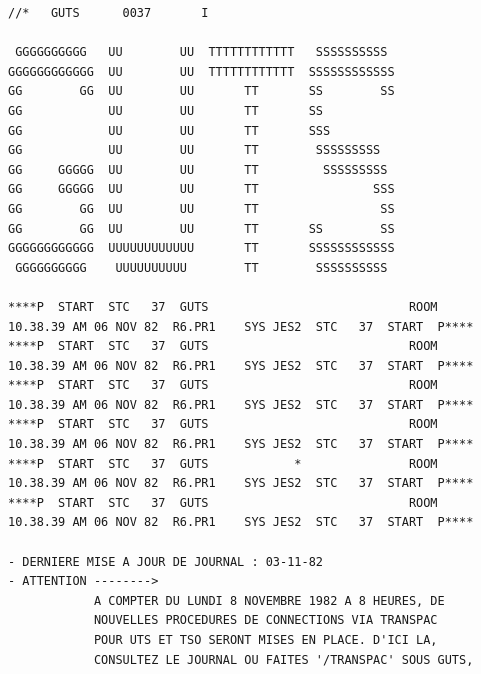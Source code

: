 {\tiny
\begin{verbatim}
//*   GUTS      0037       I

 GGGGGGGGGG   UU        UU  TTTTTTTTTTTT   SSSSSSSSSS
GGGGGGGGGGGG  UU        UU  TTTTTTTTTTTT  SSSSSSSSSSSS
GG        GG  UU        UU       TT       SS        SS
GG            UU        UU       TT       SS
GG            UU        UU       TT       SSS
GG            UU        UU       TT        SSSSSSSSS
GG     GGGGG  UU        UU       TT         SSSSSSSSS
GG     GGGGG  UU        UU       TT                SSS
GG        GG  UU        UU       TT                 SS
GG        GG  UU        UU       TT       SS        SS
GGGGGGGGGGGG  UUUUUUUUUUUU       TT       SSSSSSSSSSSS
 GGGGGGGGGG    UUUUUUUUUU        TT        SSSSSSSSSS

****P  START  STC   37  GUTS                            ROOM       10.38.39 AM 06 NOV 82  R6.PR1    SYS JES2  STC   37  START  P****
****P  START  STC   37  GUTS                            ROOM       10.38.39 AM 06 NOV 82  R6.PR1    SYS JES2  STC   37  START  P****
****P  START  STC   37  GUTS                            ROOM       10.38.39 AM 06 NOV 82  R6.PR1    SYS JES2  STC   37  START  P****
****P  START  STC   37  GUTS                            ROOM       10.38.39 AM 06 NOV 82  R6.PR1    SYS JES2  STC   37  START  P****
****P  START  STC   37  GUTS            *               ROOM       10.38.39 AM 06 NOV 82  R6.PR1    SYS JES2  STC   37  START  P****
****P  START  STC   37  GUTS                            ROOM       10.38.39 AM 06 NOV 82  R6.PR1    SYS JES2  STC   37  START  P****

- DERNIERE MISE A JOUR DE JOURNAL : 03-11-82
- ATTENTION -------->
            A COMPTER DU LUNDI 8 NOVEMBRE 1982 A 8 HEURES, DE
            NOUVELLES PROCEDURES DE CONNECTIONS VIA TRANSPAC
            POUR UTS ET TSO SERONT MISES EN PLACE. D'ICI LA,
            CONSULTEZ LE JOURNAL OU FAITES '/TRANSPAC' SOUS GUTS,
\end{verbatim}
}







